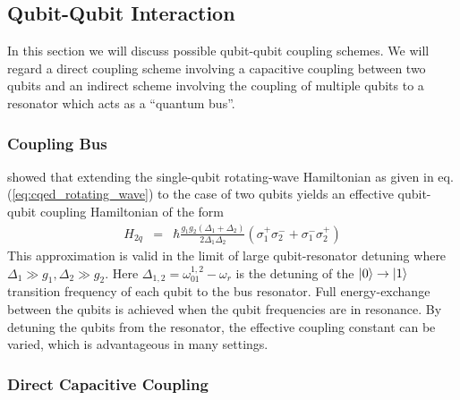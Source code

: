 \subsection{Qubit-Qubit Interaction}

In this section we will discuss possible qubit-qubit coupling schemes. We will regard a direct coupling scheme involving a capacitive coupling between two qubits and an indirect scheme involving the coupling of multiple qubits to a resonator which acts as a ``quantum bus''.

\subsubsection{Coupling Bus}

\citep{blais_quantum-information_2007} showed that extending the single-qubit rotating-wave Hamiltonian as given in eq. (\ref{eq:cqed_rotating_wave}) to the case of two qubits yields an effective qubit-qubit coupling Hamiltonian of the form
%
\begin{eqnarray}
H_{2q} & = & \hbar\frac{g_1 g_2(\Delta_1+\Delta_2)}{2\Delta_1\Delta_2}(\sigma_1^+\sigma_2^-+\sigma_1^-\sigma_2^+) \label{eq:cqed_bus_coupling}
\end{eqnarray}
%
This approximation is valid in the limit of large qubit-resonator detuning where $\Delta_1 \gg g_1,\Delta_2 \gg g_2$. Here $\Delta_{1,2} = \omega_{01}^{1,2}-\omega_r$ is the detuning of the $\left| 0 \right>\to\left| 1 \right>$ transition frequency of each qubit to the bus resonator. Full energy-exchange between the qubits is achieved when the qubit frequencies are in resonance. By detuning the qubits from the resonator, the effective coupling constant can be varied, which is advantageous in many settings. 

\subsubsection{Direct Capacitive Coupling}


